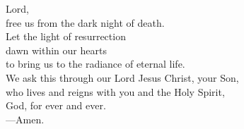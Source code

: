 \prayer


\begin{prayerverse}
Lord,\\
free us from the dark night of death.\\
Let the light of resurrection\\
dawn within our hearts\\
to bring us to the radiance of eternal life.\\
We ask this through our Lord Jesus Christ, your Son,\\
who lives and reigns with you and the Holy Spirit,\\
God, for ever and ever.\\
{\color{red}---\thinspace}Amen.
\end{prayerverse}

